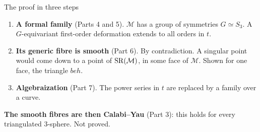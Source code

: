 \begin{frame}{The proof in three steps}
\begin{center}
\end{center}
\begin{enumerate}
\setlength{\itemsep}{4pt}
\item \textbf{A formal family} (Parts 4 and 5). \(\mathcal M\) has a group of symmetries \(G\simeq S_3\). A \(G\)-equivariant first-order deformation extends to all orders in \(t\).
\item \textbf{Its generic fibre is smooth} (Part 6). By contradiction. A singular point would come down to a point of \(\operatorname{SR}(\mathcal M)\), in some face of \(\mathcal M\). Shown for one face, the triangle \(beh\).
\item \textbf{Algebraization} (Part 7). The power series in \(t\) are replaced by a family over a curve.
\end{enumerate}
\textbf{The smooth fibres are then Calabi--Yau} (Part 3): this holds for every triangulated \(3\)-sphere. Not proved.
\end{frame}


